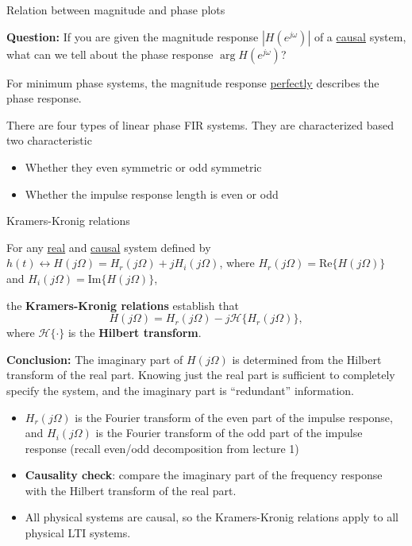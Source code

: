 \documentclass[10pt, handout]{beamer}
\begin{document}
\begin{frame}{Relation between magnitude and phase plots}

\textbf{Question:} If you are given the magnitude response $|H(e^{j\omega})|$ of a \underline{causal} system, what can we tell about the phase response $\arg H(e^{j\omega})$?

\vspace{5mm}
\pause
For minimum phase systems, the magnitude response \underline{perfectly} describes the phase response.

There are four types of linear phase FIR systems. They are characterized based two characteristic
\begin{itemize}
	\item Whether they even symmetric or odd symmetric
	\item Whether the impulse response length is even or odd
\end{itemize}

\end{frame}

\begin{frame}{Kramers-Kronig relations}

For any \underline{real} and \underline{causal} system defined by $h(t) \leftrightarrow H(j\Omega) = H_r(j\Omega) + jH_i(j\Omega)$, where $H_r(j\Omega) = \mathrm{Re}\{H(j\Omega)\}$ and $H_i(j\Omega) = \mathrm{Im}\{H(j\Omega)\}$,

the \textbf{Kramers-Kronig relations} establish that
\begin{equation*}
H(j\Omega) = H_r(j\Omega) - j\mathcal{H}\{H_r(j\Omega)\},
\end{equation*}
where $\mathcal{H}\{\cdot\}$ is the \textbf{Hilbert transform}.

\pause
\textbf{Conclusion:} The imaginary part of $H(j\Omega)$ is determined from the Hilbert transform of the real part. Knowing just the real part is sufficient to completely specify the system, and the imaginary part is ``redundant'' information.

\pause
\begin{itemize}
	\item $H_r(j\Omega)$ is the Fourier transform of the even part of the impulse response, and  $H_i(j\Omega)$ is the Fourier transform of the odd part of the impulse response (recall even/odd decomposition from lecture 1)
	\item \textbf{Causality check}: compare the imaginary part of the frequency response with the Hilbert transform of the real part.
	\item All physical systems are causal, so the Kramers-Kronig relations apply to all physical LTI systems.
\end{itemize}
\end{frame}
\end{document}
